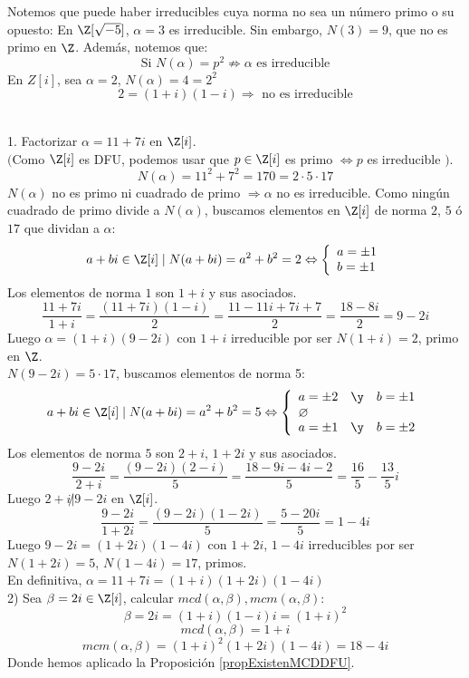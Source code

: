 Notemos que puede haber irreducibles cuya norma no sea un número primo o su opuesto:
En $\Z[\sqrt{-5}]$, $\alpha = 3$ es irreducible. Sin embargo, $N(3)=9$, que
no es primo en $\Z$. Además, notemos que:
$$\mbox{Si } N(\alpha) = p^2 \nRightarrow \alpha \mbox{ es irreducible}$$
En $Z[i]$, sea $\alpha = 2$, $N(\alpha)=4=2^2$
$$2=(1+i)(1-i) \Rightarrow \mbox{ no es irreducible}$$

\begin{ejemplo}
    \ \\
    1. Factorizar $\alpha = 11+7i$ en $\Z[i]$.\\

    
    $($Como $\Z[i]$ es DFU, podemos usar que $p \in \Z[i]$ es primo $\Leftrightarrow p$ es irreducible $)$.\newline
    $$N(\alpha) = 11^2 + 7^2 = 170 = 2 \cdot 5 \cdot 17$$
    $N(\alpha)$ no es primo ni cuadrado de primo $\Rightarrow \alpha$ no es irreducible.\newline
    Como ningún cuadrado de primo divide a $N(\alpha)$, buscamos elementos en $\Z[i]$ de norma $2$, $5$ ó $17$ que
    dividan a $\alpha$:
    $$a+bi \in \Z[i] \mid N(a+bi) = a^2 + b^2 = 2 \Leftrightarrow \left\{ \begin{array}{l}
            a = \pm 1 \\
            b = \pm 1
        \end{array} \right.$$
    Los elementos de norma $1$ son $1+i$ y sus asociados.
    $$\dfrac{11+7i}{1+i} = \dfrac{(11+7i)(1-i)}{2} = \dfrac{11-11i+7i+7}{2} = \dfrac{18-8i}{2} = 9-2i$$
    Luego $\alpha = (1+i)(9-2i)$ con $1+i$ irreducible por ser $N(1+i) = 2$, primo en $\Z$.\\

    
    $N(9-2i) = 5 \cdot 17$, buscamos elementos de norma 5:
    $$a+bi \in \Z[i] \mid N(a+bi) = a^2 + b^2 = 5 \Leftrightarrow \left\{ \begin{array}{lll}
            a = \pm 2 & \y & b = \pm 1 \\
            \o        &    &           \\
            a = \pm 1 & \y & b = \pm 2
        \end{array} \right.$$
    Los elementos de norma $5$ son $2+i$, $1+2i$ y sus asociados.
    $$\dfrac{9-2i}{2+i}= \dfrac{(9-2i)(2-i)}{5} = \dfrac{18-9i-4i-2}{5} = \dfrac{16}{5}-\dfrac{13}{5}i$$
    Luego $2+i\not|9-2i$ en $\Z[i]$.
    $$\dfrac{9-2i}{1+2i} = \dfrac{(9-2i)(1-2i)}{5} = \dfrac{5-20i}{5} = 1-4i$$
    Luego $9-2i = (1+2i)(1-4i)$ con $1+2i$, $1-4i$ irreducibles por ser $N(1+2i)=5$, $N(1-4i)=17$, primos.\\

    
    En definitiva, $\alpha = 11+7i = (1+i)(1+2i)(1-4i)$\\

    
    2) Sea $\beta = 2i \in \Z[i]$, calcular $mcd(\alpha, \beta), mcm(\alpha, \beta)$:
    $$\beta = 2i = (1+i)(1-i)i = (1+i)^2$$
    $$mcd(\alpha, \beta) = 1+i$$
    $$mcm(\alpha, \beta) = (1+i)^2(1+2i)(1-4i) = 18-4i$$
    Donde hemos aplicado la Proposición \ref{propExistenMCDDFU}.
\end{ejemplo}

